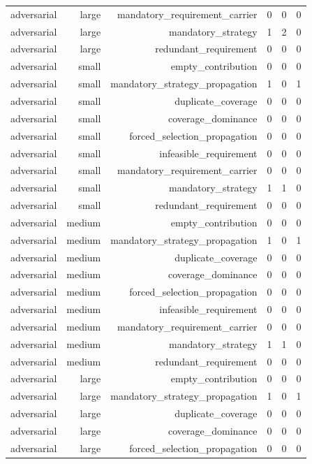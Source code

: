 {\begin{longtable}{lrrrrr}
adversarial & large & mandatory\_requirement\_carrier & 0 & 0 & 0 \\
adversarial & large & mandatory\_strategy & 1 & 2 & 0 \\
adversarial & large & redundant\_requirement & 0 & 0 & 0 \\
adversarial & small & empty\_contribution & 0 & 0 & 0 \\
adversarial & small & mandatory\_strategy\_propagation & 1 & 0 & 1 \\
adversarial & small & duplicate\_coverage & 0 & 0 & 0 \\
adversarial & small & coverage\_dominance & 0 & 0 & 0 \\
adversarial & small & forced\_selection\_propagation & 0 & 0 & 0 \\
adversarial & small & infeasible\_requirement & 0 & 0 & 0 \\
adversarial & small & mandatory\_requirement\_carrier & 0 & 0 & 0 \\
adversarial & small & mandatory\_strategy & 1 & 1 & 0 \\
adversarial & small & redundant\_requirement & 0 & 0 & 0 \\
adversarial & medium & empty\_contribution & 0 & 0 & 0 \\
adversarial & medium & mandatory\_strategy\_propagation & 1 & 0 & 1 \\
adversarial & medium & duplicate\_coverage & 0 & 0 & 0 \\
adversarial & medium & coverage\_dominance & 0 & 0 & 0 \\
adversarial & medium & forced\_selection\_propagation & 0 & 0 & 0 \\
adversarial & medium & infeasible\_requirement & 0 & 0 & 0 \\
adversarial & medium & mandatory\_requirement\_carrier & 0 & 0 & 0 \\
adversarial & medium & mandatory\_strategy & 1 & 1 & 0 \\
adversarial & medium & redundant\_requirement & 0 & 0 & 0 \\
adversarial & large & empty\_contribution & 0 & 0 & 0 \\
adversarial & large & mandatory\_strategy\_propagation & 1 & 0 & 1 \\
adversarial & large & duplicate\_coverage & 0 & 0 & 0 \\
adversarial & large & coverage\_dominance & 0 & 0 & 0 \\
adversarial & large & forced\_selection\_propagation & 0 & 0 & 0 \\

\end{longtable}}
